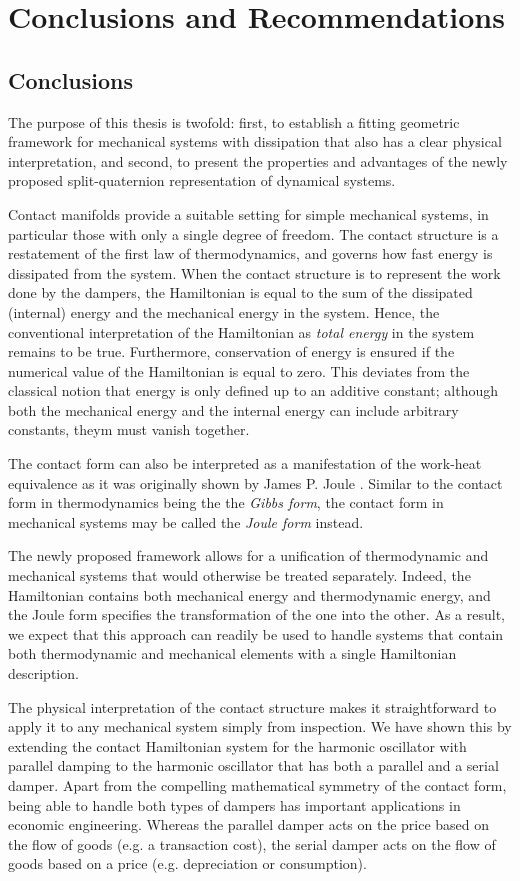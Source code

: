 \chapter{Conclusions and Recommendations}
\label{chap:conclusion}

\section*{Conclusions}
The purpose of this thesis is twofold: first, to establish a fitting geometric framework for mechanical systems with dissipation that also has a clear physical interpretation, and second, to present the properties and advantages of the newly proposed split-quaternion representation of dynamical systems. 

Contact manifolds provide a suitable setting for simple mechanical systems, in particular those with only a single degree of freedom. The contact structure is a restatement of the first law of thermodynamics, and governs how fast energy is dissipated from the system. When the contact structure is to represent the work done by the dampers, the Hamiltonian is equal to the sum of the dissipated (internal) energy and the mechanical energy in the system. Hence, the conventional interpretation of the Hamiltonian as \emph{total energy} in the system remains to be true. Furthermore, conservation of energy is ensured if the numerical value of the Hamiltonian is equal to zero. This deviates from the classical notion that energy is only defined up to an additive constant; although both the mechanical energy and the internal energy can include arbitrary constants, theym must vanish together.

The contact form can also be interpreted as a manifestation of the work-heat equivalence as it was originally shown by James P. Joule \cite{joule1850}. Similar to the contact form in thermodynamics being the the \emph{Gibbs form}, the contact form in mechanical systems may be called the \emph{Joule form} instead. 

The newly proposed framework allows for a unification of thermodynamic and mechanical systems that would otherwise be treated separately. Indeed, the Hamiltonian contains both mechanical energy and thermodynamic energy, and the Joule form specifies the transformation of the one into the other. As a result, we expect that this approach can readily be used to handle systems that contain both thermodynamic and mechanical elements with a single Hamiltonian description.

The physical interpretation of the contact structure makes it straightforward to apply it to any mechanical system simply from inspection. We have shown this by extending the contact Hamiltonian system for the harmonic oscillator with parallel damping to the harmonic oscillator that has both a parallel and a serial damper. Apart from the compelling mathematical symmetry of the contact form, being able to handle both types of dampers has important applications in economic engineering. Whereas the parallel damper acts on the price based on the flow of goods (e.g. a transaction cost), the serial damper acts on the flow of goods based on a price (e.g. depreciation or consumption).


